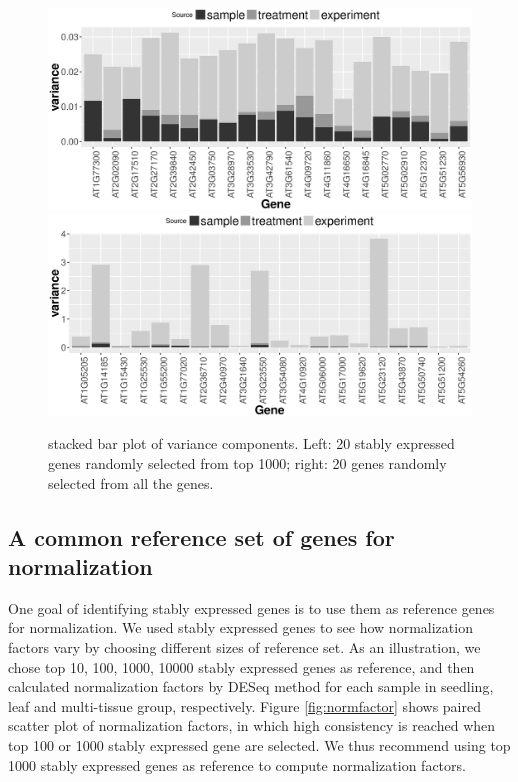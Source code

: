 \documentclass[11pt, a4paper]{article}
\begin{document}
\begin{figure}[!h]
	\centering
	\includegraphics[width=0.8\linewidth]{Figures/top1000.eps}
	\includegraphics[width=0.8\linewidth]{Figures/all.eps}
	\caption{stacked bar plot of variance components. Left: 20 stably expressed genes randomly selected from top 1000; right: 20 genes randomly selected from all the genes.}
	\label{fig:all}
\end{figure}




\subsection{A common reference set of genes for normalization}\label{Section:commonReference}
One goal of identifying stably expressed genes is to use them as reference genes for normalization. We used stably expressed genes to see how normalization factors vary by choosing different sizes of reference set.   As an illustration, we chose top 10, 100, 1000, 10000 stably expressed genes as reference, and then calculated normalization factors by DESeq method for each sample in seedling, leaf and multi-tissue group, respectively. Figure \ref{fig:normfactor} shows paired scatter plot of normalization factors, in which high consistency is reached when top 100 or 1000 stably expressed gene are selected. We thus recommend using top 1000 stably expressed genes as reference to compute normalization factors. %
\end{document}
